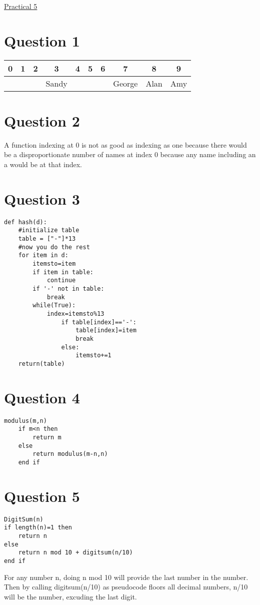 \documentclass{article}[18pt]
\begin{document}
\begin{center}
\underline{\huge Practical 5}
\end{center}
\section{Question 1}
\begin{tabular}{|c|c|c|c|c|c|c|c|c|c|}
	\hline 
	0 & 1 & 2 & 3 & 4 & 5 & 6 & 7 & 8 & 9 \\ 
	\hline 
	&  &  & Sandy &  &  &  & George & Alan & Amy \\ 
	\hline 
\end{tabular} 
\section{Question 2}
A function indexing at 0 is not as good as indexing as one because there would be a disproportionate number of names at index 0 because any name including an a would be at that index.
\section{Question 3}
\begin{lstlisting}
def hash(d):
	#initialize table
	table = ["-"]*13
	#now you do the rest
	for item in d:
		itemsto=item
		if item in table:
			continue
		if '-' not in table:
			break
		while(True):
			index=itemsto%13
				if table[index]=='-':
					table[index]=item
					break
				else:
					itemsto+=1
	return(table)	
\end{lstlisting}

\section{Question 4}
\begin{lstlisting}
modulus(m,n)
	if m<n then
		return m
	else
		return modulus(m-n,n)
	end if
\end{lstlisting}
\section{Question 5}
\begin{lstlisting}
DigitSum(n)
if length(n)=1 then
	return n
else
	return n mod 10 + digitsum(n/10)
end if
\end{lstlisting}
For any number n, doing n mod 10 will provide the last number in the number. Then by calling digitsum(n/10) as pseudocode floors all decimal numbers, n/10 will be the number, excuding the last digit.
\end{document}
